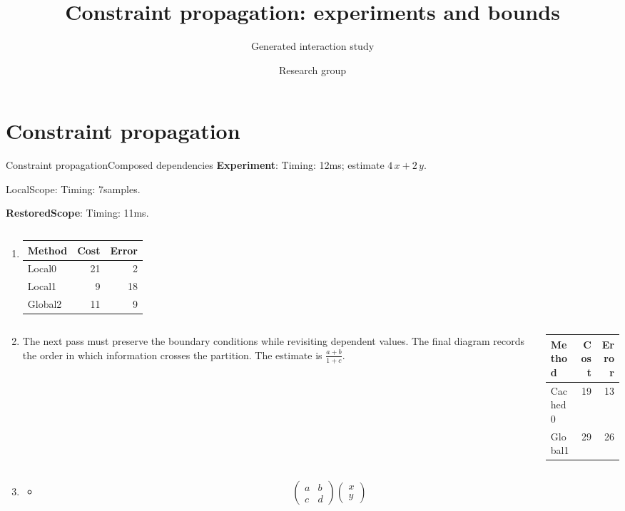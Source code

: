 \documentclass[10pt,aspectratio=43]{beamer}
\title{Constraint propagation: experiments and bounds}
\subtitle{Generated interaction study}
\author{Research group}
\date{}
\newcommand{\fuzzlayerA}[1]{\textbf{#1}}
\newcommand{\fuzzterm}[1]{\fuzzlayerA{#1}}
\newcommand{\fuzzpair}[2]{\fuzzterm{#1}: #2}
\newcommand{\fuzzunit}{ms}
\newcommand{\fuzzcoefficient}{4}
\newcommand{\fuzzscale}[2][\fuzzcoefficient]{#1\,#2}
\begin{document}
\section{Constraint propagation}
\begin{frame}[t,shrink=5]{Constraint propagation}{Composed dependencies}
\fuzzpair{Experiment}{Timing: 12\fuzzunit; estimate $\fuzzscale{x}+\fuzzscale[2]{y}$.}\par
{\renewcommand{\fuzzunit}{samples}\let\fuzzterm\textrm\fuzzpair{LocalScope}{Timing: 7\fuzzunit.}\par}
\fuzzpair{RestoredScope}{Timing: 11\fuzzunit.}\par
\begin{columns}[onlytextwidth,T]
\begin{column}{0.62\textwidth}
\begin{enumerate}
\item {\scriptsize\color{black}\raggedleft
\begin{tabular}{lrr}Method&Cost&Error\\\hline
Local0&21&2\\
Local1&9&18\\
Global2&11&9\\
\end{tabular}\par}
\item \begin{columns}[onlytextwidth,t]
\begin{column}{0.46\textwidth}
\textrm{The next pass} must preserve the boundary conditions while revisiting dependent values. The final diagram records the order in which information crosses the partition. The estimate is $\frac{a+b}{1+c}$.
\end{column}
\begin{column}{0.50\textwidth}
\begin{tabular}{lrr}Method&Cost&Error\\\hline
Cached0&19&13\\
Global1&29&26\\
\end{tabular}
\end{column}
\end{columns}
\item \begin{itemize}
\item \[\begin{pmatrix}a&b\\c&d\end{pmatrix}\begin{pmatrix}x\\y\end{pmatrix}\]

\end{itemize}
\end{enumerate}
\end{column}
\end{columns}
\end{frame}
\end{document}
